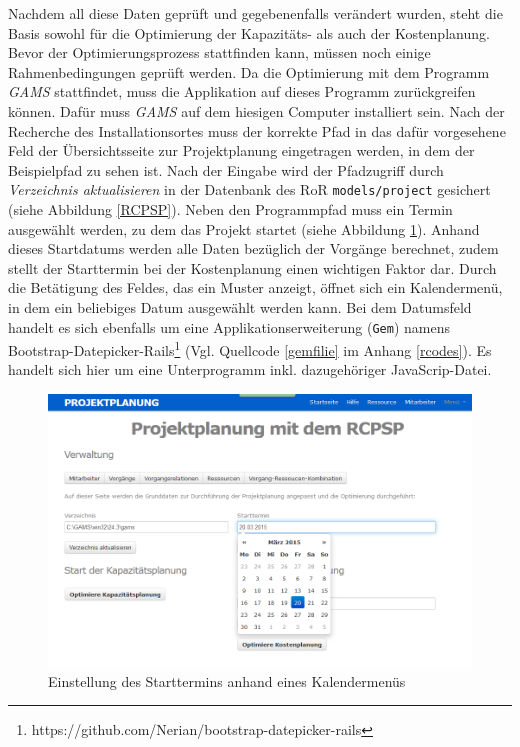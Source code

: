 \documentclass[a4paper,12pt,parskip,bibtotoc,liststotoc]{article}
\begin{document}
Nachdem all diese Daten geprüft und gegebenenfalls verändert wurden, steht die Basis sowohl für die Optimierung der Kapazitäts- als auch der Kostenplanung. Bevor der Optimierungsprozess stattfinden kann, müssen noch einige Rahmenbedingungen geprüft werden. Da die Optimierung mit dem Programm \textit{GAMS} stattfindet, muss die Applikation auf dieses Programm zurückgreifen können. Dafür muss \textit{GAMS} auf dem hiesigen Computer installiert sein. Nach der Recherche des Installationsortes muss der korrekte Pfad in das dafür vorgesehene Feld der Übersichtsseite zur Projektplanung eingetragen werden, in dem der Beispielpfad zu sehen ist. Nach der Eingabe wird der Pfadzugriff durch \textit{Verzeichnis aktualisieren} in der Datenbank des RoR \texttt{models/project} gesichert (siehe Abbildung \ref{RCPSP}). Neben den Programmpfad muss ein Termin ausgewählt werden, zu dem das Projekt startet (siehe Abbildung \ref{Startdatum}). Anhand dieses Startdatums werden alle Daten bezüglich der Vorgänge berechnet, zudem stellt der Starttermin bei der Kostenplanung einen wichtigen Faktor dar. Durch die Betätigung des Feldes, das ein Muster anzeigt, öffnet sich ein Kalendermenü, in dem ein beliebiges Datum ausgewählt werden kann. Bei dem Datumsfeld handelt es sich ebenfalls um eine Applikationserweiterung (\texttt{Gem}) namens \glqq Bootstrap-Datepicker-Rails\grqq\footnote{https://github.com/Nerian/bootstrap-datepicker-rails} (Vgl. Quellcode \ref{gemfilie} im Anhang \ref{rcodes}). Es handelt sich hier um eine Unterprogramm inkl. dazugehöriger JavaScrip-Datei. \\  

\begin{figure}[h!]
  \begin{center}
    \includegraphics[width=120mm]{Bilder/Projektplanung_Datum.png}
    \caption{Einstellung des Starttermins anhand eines Kalendermenüs}  \label{Startdatum}
  \end{center}
\end{figure}
\end{document}
